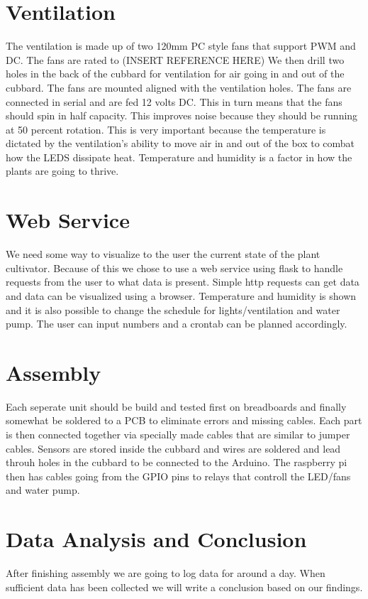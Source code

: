 \documentclass[a4paper,12pt,twoside,openright,titlepage]{book}
\begin{document}
\section{Ventilation}
The ventilation is made up of two 120mm PC style fans that support PWM and DC. The fans are rated to (INSERT REFERENCE HERE)
We then drill two holes in the back of the cubbard for ventilation for air going in and out of the cubbard. The fans are mounted aligned with the ventilation holes. The fans are connected in serial and are fed 12 volts DC. This in turn means that the fans should spin in half capacity. This improves noise because they should be running at 50 percent rotation. This is very important because the temperature is dictated by the ventilation's ability to move air in and out of the box to combat how the LEDS dissipate heat. Temperature and humidity is a factor in how the plants are going to thrive.

\section{Web Service}

We need some way to visualize to the user the current state of the plant cultivator. Because of this we chose to use a web service using flask to handle requests from the user to what data is present. Simple http requests can get data and data can be visualized using a browser. Temperature and humidity is shown and it is also possible to change the schedule for lights/ventilation and water pump. The user can input numbers and a crontab can be planned accordingly.

\section{Assembly}

Each seperate unit should be build and tested first on breadboards and finally somewhat be soldered to a PCB to eliminate errors and missing cables. Each part is then connected together via specially made cables that are similar to jumper cables. Sensors are stored inside the cubbard and wires are soldered and lead throuh holes in the cubbard to be connected to the Arduino. The raspberry pi then has cables going from the GPIO pins to relays that controll the LED/fans and water pump.

\section{Data Analysis and Conclusion}
After finishing assembly we are going to log data for around a day. When sufficient data has been collected we will write a conclusion based on our findings.
\end{document}
